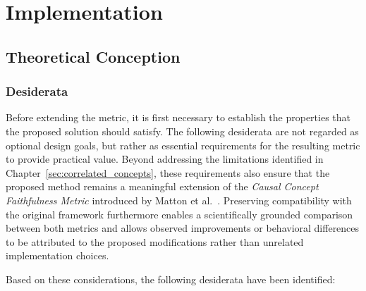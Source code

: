 \chapter{Implementation}

\section{Theoretical Conception}

\subsection{Desiderata}

Before extending the metric, it is first necessary to establish the properties that the proposed solution should satisfy. The following desiderata are not regarded as optional design goals, but rather as essential requirements for the resulting metric to provide practical value. Beyond addressing the limitations identified in Chapter~\ref{sec:correlated_concepts}, these requirements also ensure that the proposed method remains a meaningful extension of the \emph{Causal Concept Faithfulness Metric} introduced by Matton et al.\ \cite{mattonWalkTalkMeasuring2024}. Preserving compatibility with the original framework furthermore enables a scientifically grounded comparison between both metrics and allows observed improvements or behavioral differences to be attributed to the proposed modifications rather than unrelated implementation choices.

Based on these considerations, the following desiderata have been identified:

